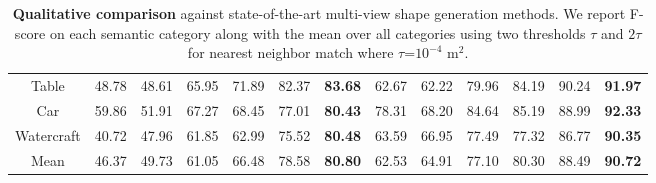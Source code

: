 \begin{table}[ht]
\begin{center}
{\begin{tabular}{|c|cccccc|cccccc|}
    Table       & 48.78 & 48.61 & 65.95 & 71.89 & 82.37 & \bf{83.68}    & 62.67 & 62.22 & 79.96 & 84.19 & 90.24 & \bf{91.97} \\
    Car         & 59.86 & 51.91 & 67.27 & 68.45 & 77.01 & \bf{80.43}    & 78.31 & 68.20 & 84.64 & 85.19 & 88.99 & \bf{92.33} \\
    Watercraft  & 40.72 & 47.96 & 61.85 & 62.99 & 75.52 & \bf{80.48}    & 63.59 & 66.95 & 77.49 & 77.32 & 86.77 & \bf{90.35} \\
    \hline
    Mean        & 46.37 & 49.73 & 61.05 & 66.48 & 78.58 & \bf{80.80}    & 62.53 & 64.91 & 77.10 & 80.30 & 88.49 & \bf{90.72} \\
    \hline
\end{tabular}}
\end{center}
\vspace{-4mm}
\caption{
    \textbf{Qualitative comparison} against state-of-the-art multi-view shape generation methods. We report F-score on each semantic category along with the mean over all categories using two thresholds $\tau$ and $2\tau$ for nearest neighbor match where ${\tau}$=$10^{-4}$ m$^2$.
}
\label{table:baseline_comparison}
\end{table}

